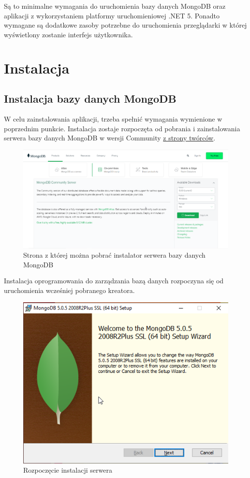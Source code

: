 \documentclass[a4paper,twoside,12pt]{book}
\begin{document}
Są to minimalne wymagania do uruchomienia bazy danych MongoDB oraz aplikacji z wykorzystaniem platformy uruchomieniowej .NET 5. Ponadto wymagane są dodatkowe zasoby potrzebne do uruchomienia przeglądarki w której wyświetlony zostanie interfejs użytkownika.

\section {Instalacja}

\subsection{Instalacja bazy danych MongoDB}
W celu zainstalowania aplikacji, trzeba spełnić wymagania wymienione w poprzednim punkcie. Instalacja zostaje rozpoczęta od pobrania i zainstalowania serwera bazy danych MongoDB w wersji Community \href{https://www.mongodb.com/try/download/community}{z strony twórców}.
\FloatBarrier
\begin{figure}[H]
	\centering
	\includegraphics[width=0.7\linewidth]{../zrzuty_ekranu/instalcja_mongodb/mongodbsite}
	\caption{Strona z której można pobrać instalator serwera bazy danych MongoDB}
	\label{fig:mongodbsite}
\end{figure}
\afterpage{\clearpage}
\FloatBarrier

Instalacja oprogramowania do zarządzania bazą danych rozpoczyna się od uruchomienia wcześniej pobranego kreatora.
\FloatBarrier
\begin{figure}[H]
	\centering
	\includegraphics[width=0.7\linewidth]{../zrzuty_ekranu/instalcja_mongodb/mongodb1}
	\caption{Rozpoczęcie instalacji serwera}
	\label{fig:mongodb1}
\end{figure}
\afterpage{\clearpage}
\FloatBarrier
\end{document}
